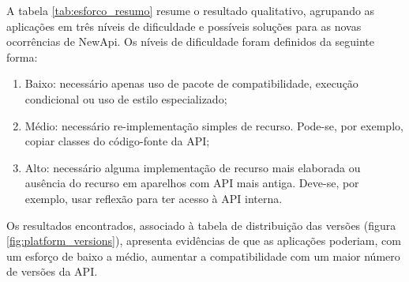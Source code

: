 A tabela \ref{tab:esforco_resumo} resume o resultado qualitativo, agrupando as aplicações
em três níveis de dificuldade e possíveis soluções para as novas ocorrências de NewApi.
Os níveis de dificuldade foram definidos da seguinte forma:
\begin{enumerate}
	\item Baixo: necessário apenas uso de pacote de compatibilidade, execução condicional ou
	uso de estilo especializado;
	\item Médio: necessário re-implementação simples de recurso. Pode-se, por exemplo, copiar
	classes do código-fonte da API;
	\item Alto: necessário alguma implementação de recurso mais elaborada ou ausência do
	recurso em aparelhos com API mais antiga. Deve-se, por exemplo, usar reflexão para
	ter acesso à API interna.
\end{enumerate}
Os resultados encontrados, associado à tabela de distribuição das versões (figura 
\ref{fig:platform_versions}), apresenta evidências de que as aplicações poderiam,
com um esforço de baixo a médio, aumentar a compatibilidade com um maior número de
versões da API.  

